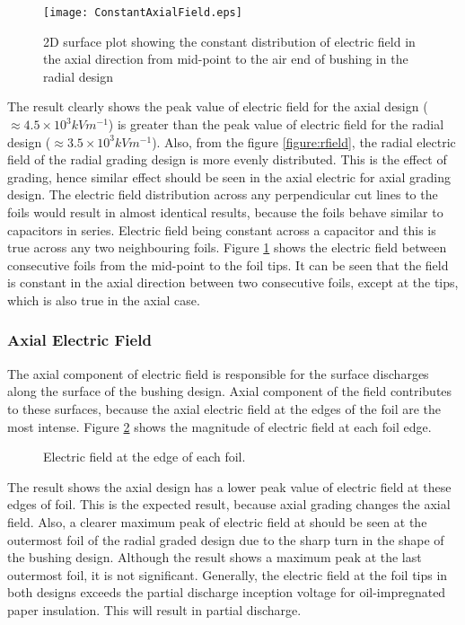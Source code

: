 \begin{figure}[!h]
\centering
\texttt{[image: ConstantAxialField.eps]}
\caption{2D surface plot showing the constant distribution of electric field in the axial direction from mid-point to the air end of bushing in the radial design}
\label{figure:constantfield}
\end{figure}
The result clearly shows the peak value of electric field for the axial design ($\approx 4.5 \times 10^3 kVm^{-1}$) is greater than the peak value of electric field for the radial design ($\approx 3.5 \times 10^3 kVm^{-1}$). Also, from the figure \ref{figure:rfield}, the radial electric field of the radial grading design is more evenly distributed. This is the effect of grading, hence similar effect should be seen in the axial electric for axial grading design. The electric field distribution across any perpendicular cut lines to the foils would result in almost identical results, because the foils behave similar to capacitors in series. Electric field being constant across a capacitor and this is true across any two neighbouring foils. Figure \ref{figure:constantfield} shows the electric field between consecutive foils from the mid-point to the foil tips. It can be seen that the field is constant in the axial direction between two consecutive foils, except at the tips, which is also true in the axial case.



\subsubsection{Axial Electric Field}
The axial component of electric field is responsible for the surface discharges along the surface of the bushing design. Axial component of the field contributes to these surfaces, because the axial electric field at the edges of the foil are the most intense. Figure \ref{figure:afield} shows the magnitude of electric field at each foil edge. 

\begin{figure}[!h]
\centering
{}
\caption{Electric field at the edge of each foil.}
\label{figure:afield}
\end{figure}

The result shows the axial design has a lower peak value of electric field at these edges of foil. This is the expected result, because axial grading changes the axial field. Also, a clearer maximum peak of electric field at should be seen at the outermost foil of the radial graded design due to the sharp turn in the shape of the bushing design. Although the result shows a maximum peak at the last outermost foil, it is not significant. Generally, the electric field at the foil tips in both designs exceeds the partial discharge inception voltage for oil-impregnated paper insulation. This will result in partial discharge.

